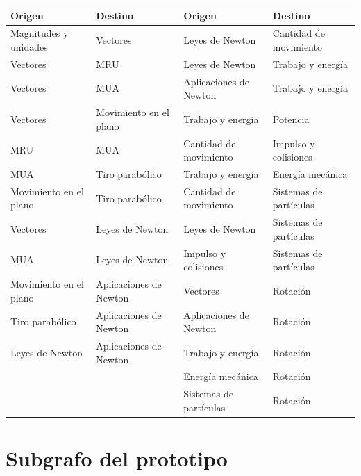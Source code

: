\documentclass[11pt]{article}
\theoremstyle{definition}
\theoremstyle{remark}
\begin{document}
\begin{center}\small
\setlength{\tabcolsep}{4pt}\begin{tabular}{@{}ll@{\hspace{1.2em}}ll@{}}
\toprule
Origen & Destino & Origen & Destino \\
\midrule
Magnitudes y unidades & Vectores & Leyes de Newton & Cantidad de movimiento \\
Vectores & MRU & Leyes de Newton & Trabajo y energía \\
Vectores & MUA & Aplicaciones de Newton & Trabajo y energía \\
Vectores & Movimiento en el plano & Trabajo y energía & Potencia \\
MRU & MUA & Cantidad de movimiento & Impulso y colisiones \\
MUA & Tiro parabólico & Trabajo y energía & Energía mecánica \\
Movimiento en el plano & Tiro parabólico & Cantidad de movimiento & Sistemas de partículas \\
Vectores & Leyes de Newton & Leyes de Newton & Sistemas de partículas \\
MUA & Leyes de Newton & Impulso y colisiones & Sistemas de partículas \\
Movimiento en el plano & Aplicaciones de Newton & Vectores & Rotación \\
Tiro parabólico & Aplicaciones de Newton & Aplicaciones de Newton & Rotación \\
Leyes de Newton & Aplicaciones de Newton & Trabajo y energía & Rotación \\
 & & Energía mecánica & Rotación \\
 & & Sistemas de partículas & Rotación \\
\bottomrule
\end{tabular}
\end{center}

\section{Subgrafo del prototipo}
\label{app:prototipo}
\end{document}
